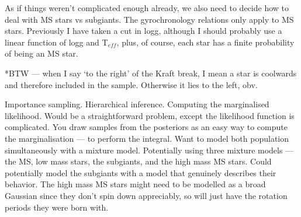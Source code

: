 \documentclass[12pt,preprint]{aastex}
\begin{document}
As if things weren't complicated enough already, we also need to decide how to deal with MS stars vs subgiants.
The gyrochronology relations only apply to MS stars.
Previously I have taken a cut in logg, although I should probably use a linear function of logg and T$_{eff}$, plus, of course, each star has a finite probability of being an MS star.

*BTW --- when I say `to the right' of the Kraft break, I mean a star is coolwards and therefore included in the sample.
Otherwise it lies to the left, obv.

Importance sampling.
Hierarchical inference.
Computing the marginalised likelihood.
Would be a straightforward problem, except the likelihood function is complicated.
You draw samples from the posteriors as an easy way to compute the marginalisation --- to perform the integral.
Want to model both population simultaneously with a mixture model.
Potentially using three mixture models --- the MS, low mass stars, the subgiants, and the high mass MS stars.
Could potentially model the subgiants with a model that genuinely describes their behavior.
The high mass MS stars might need to be modelled as a broad Gaussian since they don't spin down appreciably, so will just have the rotation periods they were born with.
\end{document}
